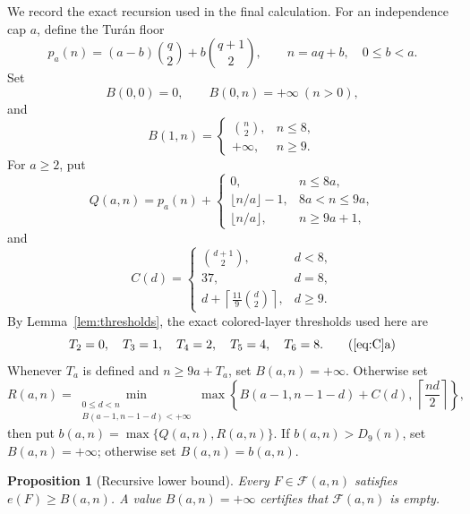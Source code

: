 \documentclass[11pt,reqno,a4paper]{amsart}
\newtheorem{proposition}[theorem]{Proposition}
\theoremstyle{definition}
\theoremstyle{remark}
\newcommand{\cF}{\mathcal F}
\newcommand{\emptycert}{+\infty}
\begin{document}
We record the exact recursion used in the final calculation. For an
independence cap $a$, define the Tur\'an floor
\[
 p_a(n)=(a-b)\binom q2+b\binom{q+1}{2},
 \qquad n=aq+b,\quad0\le b<a.
\]
Set
\[
 B(0,0)=0,\qquad B(0,n)=\emptycert\ (n>0),
\]
and
\[
 B(1,n)=
 \begin{cases}
 \binom n2,&n\le8,\\
 \emptycert,&n\ge9.
 \end{cases}
\]
For $a\ge2$, put
\begin{equation}\label{eq:Q}
 Q(a,n)=p_a(n)+
 \begin{cases}
 0,&n\le8a,\\
 \lfloor n/a\rfloor-1,&8a<n\le9a,\\
 \lfloor n/a\rfloor,&n\ge9a+1,
 \end{cases}
\end{equation}
and
\begin{equation}\label{eq:C}
 C(d)=
 \begin{cases}
 \binom{d+1}{2},&d<8,\\
 37,&d=8,\\
 d+\left\lceil\frac{11}{9}\binom d2\right\rceil,&d\ge9.
 \end{cases}
\end{equation}
By Lemma~\ref{lem:thresholds}, the exact colored-layer thresholds used
here are
\[
 T_2=0,\quad T_3=1,\quad T_4=2,\quad T_5=4,\quad T_6=8.
\tag{\ref{eq:C}a}
\]
Whenever $T_a$ is defined and $n\ge9a+T_a$, set
$B(a,n)=\emptycert$. Otherwise set
\begin{equation}\label{eq:R}
 R(a,n)=
 \min_{\substack{0\le d<n\\B(a-1,n-1-d)<\emptycert}}
 \max\left\{
 B(a-1,n-1-d)+C(d),\,
 \left\lceil\frac{nd}{2}\right\rceil
 \right\},
\end{equation}
then put $b(a,n)=\max\{Q(a,n),R(a,n)\}$. If
$b(a,n)>D_9(n)$, set $B(a,n)=\emptycert$; otherwise set
$B(a,n)=b(a,n)$.

\begin{proposition}[Recursive lower bound]\label{prop:recurrence}
Every $F\in\cF(a,n)$ satisfies $e(F)\ge B(a,n)$. A value
$B(a,n)=\emptycert$ certifies that $\cF(a,n)$ is empty.
\end{proposition}
\end{document}
